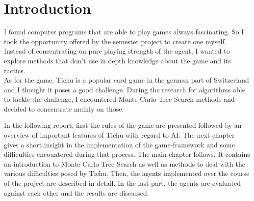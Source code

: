 \chapter{Introduction}
I found computer programs that are able to play games always fascinating. So I took the opportunity offered by the semester project to create one myself.\\
Instead of concentrating on pure playing strength of the agent, I wanted to explore methods that don’t use in depth knowledge about the game and its tactics.\\
As for the game, Tichu is a popular card game in the german part of Switzerland and I thought it poses a good challenge.
During the research for algorithms able to tackle the challenge, I encountered Monte Carlo Tree Search methods and decided to concentrate  mainly on those.

In the following report, first the rules of the game are presented followed by an overview of important features of Tichu with regard to AI.
The next chapter gives a short insight in the implementation of the game-framework and some difficulties encountered during that process.
The main chapter follows. It contains an introduction to Monte Carlo Tree Search as well as methods to deal with the various difficulties posed by Tichu. Then,  the agents implemented over the course of the project are described in detail. In the last part, the agents are evaluated against each other and the results are discussed.
